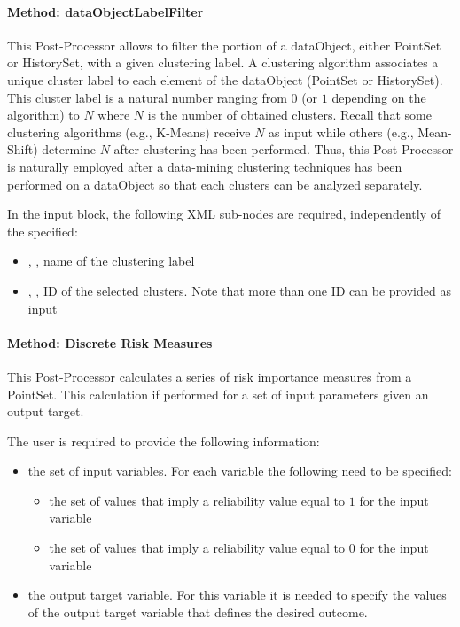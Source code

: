 \paragraph{Method: dataObjectLabelFilter}
This Post-Processor allows to filter the portion of a dataObject, either PointSet or HistorySet, with a given clustering label.
A clustering algorithm associates a unique cluster label to each element of the dataObject (PointSet or HistorySet).
This cluster label is a natural number ranging from $0$ (or $1$ depending on the algorithm) to $N$ where $N$ is the number of obtained clusters.
Recall that some clustering algorithms (e.g., K-Means) receive $N$ as input while others (e.g., Mean-Shift) determine $N$ after clustering has been performed.
Thus, this Post-Processor is naturally employed after a data-mining clustering techniques has been performed on a dataObject so that each clusters
can be analyzed separately.

In the  input block, the following XML sub-nodes are required,
independently of the  specified:

\begin{itemize}
   \item {}, , name of the clustering label
   \item {}, , ID of the selected clusters. Note that more than one ID can be provided as input
\end{itemize}


\paragraph{Method: Discrete Risk Measures}
This Post-Processor calculates a series of risk importance measures from a PointSet. This calculation if performed for a set of input parameters given an output target.

The user is required to provide the following information:
\begin{itemize}
   \item the set of input variables. For each variable the following need to be specified:
     \begin{itemize}
       \item the set of values that imply a reliability value equal to $1$ for the input variable
       \item the set of values that imply a reliability value equal to $0$ for the input variable
     \end{itemize}
   \item the output target variable. For this variable it is needed to specify the values of the output target variable that defines the desired outcome.
\end{itemize}


